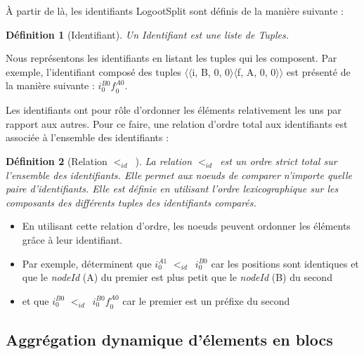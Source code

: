 \documentclass[12pt]{thesul}
\newtheorem{definition}{Définition}
\newcommand{\trm}[1]{\mathit{#1}}
\newcommand{\id}[3]{$\trm{#1}^{\trm{#2}}_{\trm{#3}}$}
\newcommand{\lid}{$<_{id}$~}
\begin{document}
À partir de là, les identifiants LogootSplit sont définis de la manière suivante :

\begin{definition}[Identifiant]
  Un \emph{Identifiant} est une liste de \emph{Tuples}.
\end{definition}


Nous représentons les identifiants en listant les tuples qui les composent.
Par exemple, l'identifiant composé des tuples $\langle\langle$i, B, 0, 0$\rangle\langle$f, A, 0, 0$\rangle\rangle$ est présenté de la manière suivante : \id{i}{B0}{0}\id{f}{A0}{0}.

Les identifiants ont pour rôle d'ordonner les éléments relativement les uns par rapport aux autres.
Pour ce faire, une relation d'ordre total aux identifiants est associée à l'ensemble des identifiants :

\begin{definition}[Relation \lid]
  La relation \lid est un ordre strict total sur l'ensemble des identifiants.
  Elle permet aux noeuds de comparer n'importe quelle paire d'identifiants.
  Elle est définie en utilisant l'ordre lexicographique sur les composants des différents tuples des identifiants comparés.
\end{definition}

\begin{itemize}
  \item En utilisant cette relation d'ordre, les noeuds peuvent ordonner les éléments grâce à leur identifiant.
  \item Par exemple, déterminent que \id{i}{A1}{0} \lid \id{i}{B0}{0} car les positions sont identiques et que le \emph{nodeId} (A) du premier est plus petit que le \emph{nodeId} (B) du second
  \item et que \id{i}{B0}{0} \lid \id{i}{B0}{0}\id{f}{A0}{0} car le premier est un préfixe du second
\end{itemize}


\subsection{Aggrégation dynamique d'élements en blocs}

\label{sec:blocs}
\end{document}
